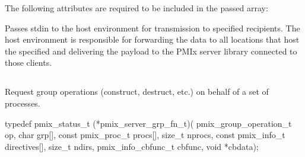 \reqattrstart
The following attributes are required to be included in the passed  array:


\reqattrend

\descr

Passes stdin to the host environment for transmission to specified recipients. The host environment is responsible for forwarding the data to all locations that host the specified  and delivering the payload to the \ac{PMIx} server library connected to those clients.

\subsection{}

\summary

Request group operations (construct, destruct, etc.) on behalf of a set of processes.

\format

\cspecificstart
\begin{codepar}
typedef pmix_status_t (*pmix_server_grp_fn_t)(
                           pmix_group_operation_t op,
                           char grp[],
                           const pmix_proc_t procs[],
                           size_t nprocs,
                           const pmix_info_t directives[],
                           size_t ndirs,
                           pmix_info_cbfunc_t cbfunc,
                           void *cbdata);
\end{codepar}
\cspecificend

\begin{arglist}
\end{arglist}

